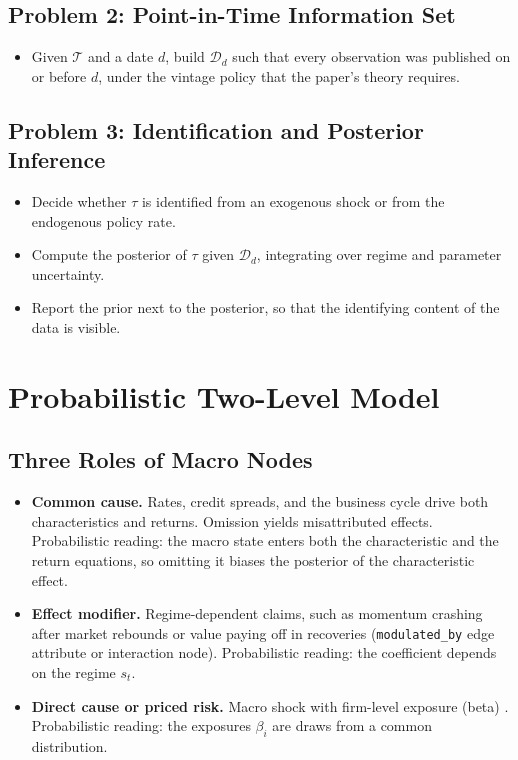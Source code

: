   \subsection{Problem 2: Point-in-Time Information
  Set}\label{sec:problem_2_point_in_time}

  \begin{itemize}
  \tightlist
  \item
    Given \(\mathcal{T}\) and a date \(d\), build \(\mathcal{D}_d\) such
    that every observation was published on or before \(d\), under the
    vintage policy that the paper's theory requires.
  \end{itemize}

  \subsection{Problem 3: Identification and Posterior
  Inference}\label{sec:problem_3_identification_and_inference}

  \begin{itemize}
  \tightlist
  \item
    Decide whether \(\tau\) is identified from an exogenous shock or
    from the endogenous policy rate.
  \item
    Compute the posterior of \(\tau\) given \(\mathcal{D}_d\), integrating
    over regime and parameter uncertainty.
  \item
    Report the prior next to the posterior, so that the identifying
    content of the data is visible.
  \end{itemize}

  \section{Probabilistic Two-Level Model}\label{sec:model}

  \subsection{Three Roles of Macro
  Nodes}\label{sec:three_roles_of_macro_nodes}

  \begin{itemize}
  \tightlist
  \item
    \textbf{Common cause.} Rates, credit spreads, and the business cycle
    drive both characteristics and returns. Omission yields misattributed
    effects. Probabilistic reading: the macro state enters both the
    characteristic and the return equations, so omitting it biases the
    posterior of the characteristic effect.
  \item
    \textbf{Effect modifier.} Regime-dependent claims, such as momentum
    crashing after market rebounds or value paying off in recoveries
    (\texttt{modulated\_by} edge attribute or interaction node).
    Probabilistic reading: the coefficient depends on the regime \(s_t\).
  \item
    \textbf{Direct cause or priced risk.} Macro shock with firm-level
    exposure (beta) \cite{chen1986economic}. Probabilistic reading: the
    exposures \(\beta_i\) are draws from a common distribution.
  \end{itemize}

